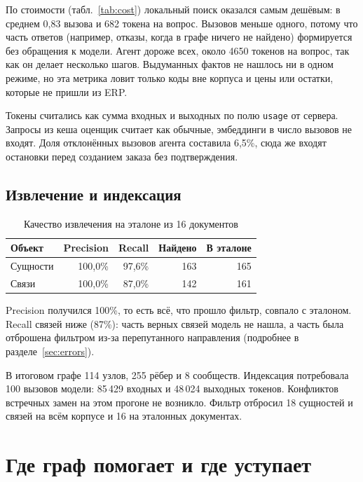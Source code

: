 \documentclass[a4paper,12pt]{article}
\newcommand{\code}[1]{\texttt{#1}}
\begin{document}
По стоимости (табл.~\ref{tab:cost}) локальный поиск оказался самым дешёвым: в среднем 0,83 вызова и 682 токена на вопрос. Вызовов меньше одного, потому что часть ответов (например, отказы, когда в графе ничего не найдено) формируется без обращения к модели. Агент дороже всех, около 4650 токенов на вопрос, так как он делает несколько шагов. Выдуманных фактов не нашлось ни в одном режиме, но эта метрика ловит только коды вне корпуса и цены или остатки, которые не пришли из ERP.

Токены считались как сумма входных и выходных по полю \code{usage} от сервера. Запросы из кеша оценщик считает как обычные, эмбеддинги в число вызовов не входят. Доля отклонённых вызовов агента составила 6,5\%, сюда же входят остановки перед созданием заказа без подтверждения.

\subsection{Извлечение и индексация}

\begin{table}[H]
\centering\small
\caption{Качество извлечения на эталоне из 16 документов}\label{tab:extr}
\begin{tabular}{@{}lrrrr@{}}
\toprule
\textbf{Объект} & \textbf{Precision} & \textbf{Recall} & \textbf{Найдено} & \textbf{В эталоне}\\
\midrule
Сущности & 100,0\% & 97,6\% & 163 & 165\\
Связи    & 100,0\% & 87,0\% & 142 & 161\\
\bottomrule
\end{tabular}
\end{table}

Precision получился 100\%, то есть всё, что прошло фильтр, совпало с эталоном. Recall связей ниже (87\%): часть верных связей модель не нашла, а часть была отброшена фильтром из-за перепутанного направления (подробнее в разделе~\ref{sec:errors}).

В итоговом графе 114 узлов, 255 рёбер и 8 сообществ. Индексация потребовала 100 вызовов модели: 85\,429 входных и 48\,024 выходных токенов. Конфликтов встречных замен на этом прогоне не возникло. Фильтр отбросил 18 сущностей и связей на всём корпусе и 16 на эталонных документах.

\section{Где граф помогает и где уступает}\label{sec:graph}
\end{document}
